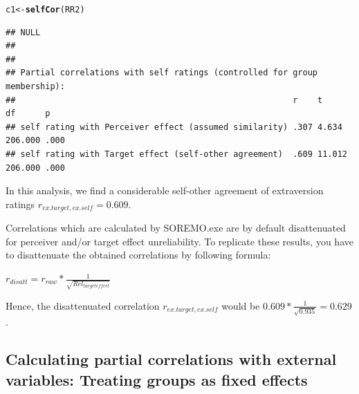 \documentclass[a4paper]{article}\usepackage[]{graphicx}\usepackage[]{color}
\makeatletter
\newcommand{\hlstd}[1]{\textcolor[rgb]{0.345,0.345,0.345}{#1}}%
\newcommand{\hlkwb}[1]{\textcolor[rgb]{0.69,0.353,0.396}{#1}}%
\newcommand{\hlkwd}[1]{\textcolor[rgb]{0.737,0.353,0.396}{\textbf{#1}}}%
\newenvironment{kframe}{%
 \def\at@end@of@kframe{}%
 \ifinner\ifhmode%
  \def\at@end@of@kframe{\end{minipage}}%
  \begin{minipage}{\columnwidth}%
 \fi\fi%
 \def\FrameCommand##1{\hskip\@totalleftmargin \hskip-\fboxsep
 \colorbox{shadecolor}{##1}\hskip-\fboxsep
     \hskip-\linewidth \hskip-\@totalleftmargin \hskip\columnwidth}%
 \MakeFramed {\advance\hsize-\width
   \@totalleftmargin\z@ \linewidth\hsize
   \@setminipage}}%
 {\par\unskip\endMakeFramed%
 \at@end@of@kframe}
\newenvironment{knitrout}{}{} %
\makeatother
\begin{document}
\begin{knitrout}
\begin{kframe}
{\ttfamily\noindent\color{warningcolor}{\#\# Warning: ex : \ 1 \ participant(s) have been excluded from group 9 due to exceedingly missing data; id(s) = 90918 .}}

{\ttfamily\noindent\color{warningcolor}{\#\# Warning: ex : \ 1 \ participant(s) have been excluded from group 12 due to exceedingly missing data; id(s) = 91213 .}}

{\ttfamily\noindent\color{warningcolor}{\#\# Warning: ex : \ 6 \ participant(s) have been excluded from group 14 due to exceedingly missing data; id(s) = 91404, 91405, 91406, 91408, 91424, 91421 .}}

{\ttfamily\noindent\color{warningcolor}{\#\# Warning: ex : \ 4 \ participant(s) have been excluded from group 18 due to exceedingly missing data; id(s) = 91807, 91808, 91810, 91821 .}}

{\ttfamily\noindent\color{warningcolor}{\#\# Warning: ex : \ 4 \ participant(s) have been excluded from group 20 due to exceedingly missing data; id(s) = 92002, 92009, 92013, 92019 .}}\begin{alltt}
\hlstd{c1} \hlkwb{<-} \hlkwd{selfCor}\hlstd{(RR2)}
\end{alltt}
\begin{verbatim}
## NULL
## 
## 
## Partial correlations with self ratings (controlled for group membership):
##                                                        r    t      df      p   
## self rating with Perceiver effect (assumed similarity) .307 4.634  206.000 .000
## self rating with Target effect (self-other agreement)  .609 11.012 206.000 .000
\end{verbatim}
\end{kframe}
\end{knitrout}


In this analysis, we find a considerable self-other agreement of extraversion ratings $r_{ex.target,ex.self}=0.609$.

Correlations which are calculated by SOREMO.exe are by default disattenuated for perceiver and/or target effect unreliability. To replicate these results, you have to disattenuate the obtained correlations by following formula:

$r_{disatt} = r_{raw}*\frac{1}{\sqrt{Rel_{target effect}}}$

Hence, the disattenuated correlation $r_{ex.target,ex.self}$ would be $0.609*\frac{1}{\sqrt{0.935}} = 0.629$.






\subsection{Calculating partial correlations with external variables: Treating groups as fixed effects} %
\label{subsec:part}
\end{document}
